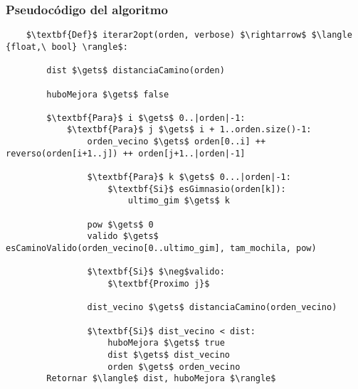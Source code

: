     \newpage
    \subsubsection{Pseudocódigo del algoritmo}

    \begin{lstlisting}
    $\textbf{Def}$ iterar2opt(orden, verbose) $\rightarrow$ $\langle {float,\ bool} \rangle$:

        dist $\gets$ distanciaCamino(orden)

        huboMejora $\gets$ false

        $\textbf{Para}$ i $\gets$ 0..|orden|-1:
            $\textbf{Para}$ j $\gets$ i + 1..orden.size()-1:
                orden_vecino $\gets$ orden[0..i] ++ reverso(orden[i+1..j]) ++ orden[j+1..|orden|-1]

                $\textbf{Para}$ k $\gets$ 0...|orden|-1:
                    $\textbf{Si}$ esGimnasio(orden[k]):
                        ultimo_gim $\gets$ k

                pow $\gets$ 0
                valido $\gets$ esCaminoValido(orden_vecino[0..ultimo_gim], tam_mochila, pow)

                $\textbf{Si}$ $\neg$valido:
                    $\textbf{Proximo j}$

                dist_vecino $\gets$ distanciaCamino(orden_vecino)

                $\textbf{Si}$ dist_vecino < dist:
                    huboMejora $\gets$ true
                    dist $\gets$ dist_vecino
                    orden $\gets$ orden_vecino
        Retornar $\langle$ dist, huboMejora $\rangle$
    \end{lstlisting}
